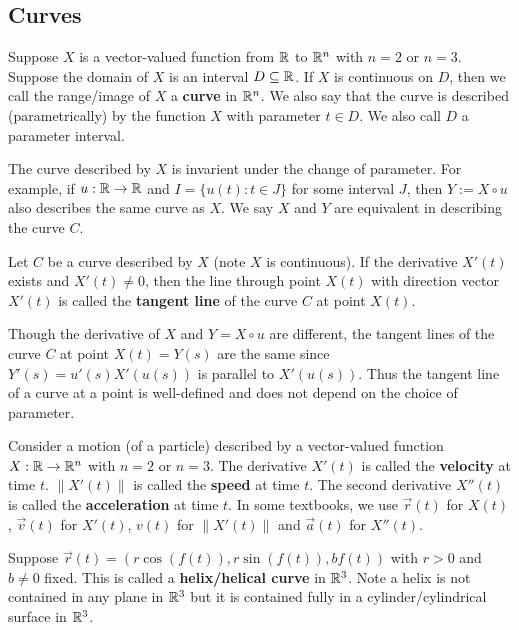 \documentclass[a4paper]{ctexart}
\begin{document}
    \subsection{Curves}
    \begin{mydef}
        Suppose $X$ is a vector-valued function from $\mathbb{R}$ to $\mathbb{R}^n$ with $n=2$ or $n=3$. Suppose the domain of $X$ is an interval $D\subseteq \mathbb{R}$. If $X$ is continuous on $D$, then we call the range/image of $X$ a \textbf{curve} in $\mathbb{R}^n$. We also say that the curve is described (parametrically) by the function $X$ with parameter $t\in D$. We also call $D$ a parameter interval.
    \end{mydef}
    \begin{myrmk}
        The curve described by $X$ is invarient under the change of parameter. For example, if $u:\mathbb{R} \to \mathbb{R}$ and $I = \{u(t) :t \in J\}$ for some interval $J$, then $Y := X\circ u$ also describes the same curve as $X$. We say $X$ and $Y$ are equivalent in describing the curve $C$.
    \end{myrmk}
    \begin{mydef}
        Let $C$ be a curve described by $X$ (note $X$ is continuous). If the derivative $X'(t)$ exists and $X'(t) \ne 0$, then the line through point $X(t)$ with direction vector $X'(t)$ is called the \textbf{tangent line} of the curve $C$ at point $X(t)$.
    \end{mydef}
    \begin{myrmk}
        Though the derivative of $X$ and $Y=X\circ u$ are different, the tangent lines of the curve $C$ at point $X(t) = Y(s)$ are the same since $Y'(s) = u'(s) X'(u(s))$ is parallel to $X'(u(s))$. Thus the tangent line of a curve at a point is well-defined and does not depend on the choice of parameter.
    \end{myrmk}
    \begin{mydef}
        Consider a motion (of a particle) described by a vector-valued function $X: \mathbb{R} \to \mathbb{R}^n$ with $n=2$ or $n=3$. The derivative $X'(t)$ is called the \textbf{velocity} at time $t$. $\| X'(t)\|$ is called the \textbf{speed} at time $t$. The second derivative $X''(t)$ is called the \textbf{acceleration} at time $t$. In some textbooks, we use $\vec{r}(t)$ for $X(t)$, $\vec{v}(t)$ for $X'(t)$, $v(t)$ for $\| X'(t)\|$ and $\vec{a}(t)$ for $X''(t)$.
    \end{mydef}
    \begin{myex}
        Suppose $\vec{r}(t) = (r \cos(f(t)), r \sin(f(t)), bf(t))$ with $r>0$ and $b\ne 0$ fixed. This is called a \textbf{helix/helical curve} in $\mathbb{R}^3$. Note a helix is not contained in any plane in $\mathbb{R}^3$ but it is contained fully in a cylinder/cylindrical surface in $\mathbb{R}^3$.
    \end{myex}
\end{document}
